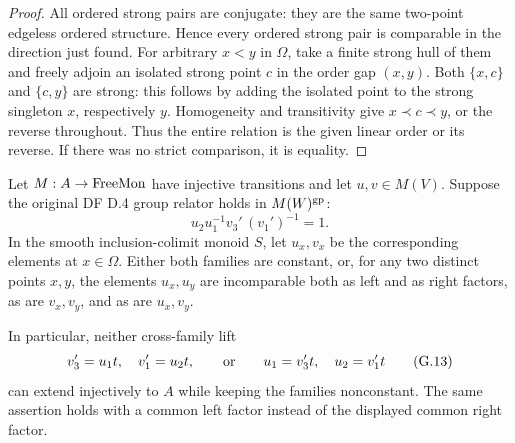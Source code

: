 \begin{proof}
All ordered strong pairs are conjugate: they are the same
two-point edgeless ordered structure.  Hence every ordered
strong pair is comparable in the direction just found.
For arbitrary $x<y$ in $\Omega$, take a finite strong hull
of them and freely adjoin an isolated strong point $c$ in the
order gap $(x,y)$.  Both $\{x,c\}$ and $\{c,y\}$ are strong:
this follows by adding the isolated point to the strong
singleton $x$, respectively $y$.  Homogeneity and transitivity
give $x\prec c\prec y$, or the reverse throughout.
Thus the entire relation is the given linear order or its
reverse.  If there was no strict comparison, it is equality.
\end{proof}

\begin{proposition}
\label{G:separation}
Let $M:A\to\mathrm{FreeMon}$ have injective transitions and let
$u,v\in M(V)$.  Suppose the original DF D.4 group relator
holds in $M(W)^{\mathrm{gp}}$:
\[
 u_2u_1^{-1}v_3'\,(v_1')^{-1}=1.
 \tag{G.12}
\]
In the smooth inclusion-colimit monoid $S$, let $u_x,v_x$
be the corresponding elements at $x\in\Omega$.  Either both
families are constant, or, for any two distinct points $x,y$,
the elements $u_x,u_y$ are incomparable both as left and as
right factors, as are $v_x,v_y$, and as are $u_x,v_y$.

In particular, neither cross-family lift
\[
 v_3'=u_1t,\quad v_1'=u_2t,
 \qquad\hbox{or}\qquad
 u_1=v_3't,\quad u_2=v_1't
 \tag{G.13}
\]
can extend injectively to $A$ while keeping the families
nonconstant.  The same assertion holds with a common left
factor instead of the displayed common right factor.
\end{proposition}
